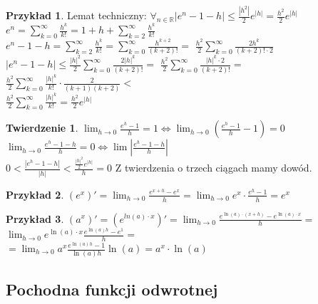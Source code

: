 \documentclass{article}
\theoremstyle{definition}
\theoremstyle{definition}
\newtheorem{tw}{Twierdzenie}[subsection]
\theoremstyle{definition}
\newtheorem{pk}{Przykład}[subsection]
\theoremstyle{definition}
\begin{document}
\begin{pk}
    Lemat techniczny:
    $\forall_{n\in\mathbb{R}} |e^n-1-h| \leq \frac{|h^2|}{2}e^{|h|} = \frac{h^2}{2}e^{|h|}$\\
    $e^n=\sum_{k=0}^{\infty} \frac{h^k}{k!}= 1+h+\sum_{k=2}^{\infty} \frac{h^k}{k!}$\\
    $e^n-1-h=\sum_{k=2}^{\infty} \frac{h^k}{k!} = \sum_{k=0}^{\infty} \frac{h^{k+2}}{(k+2)!}=$
    $\frac{h^2}{2} \sum_{k=0}^{\infty} \frac{2h^k}{(k+2)!\cdot 2}$\\
    $|e^n-1-h| \leq \frac{|h|^2}{2} \sum_{k=0}^{\infty} \frac{2|h|^k}{(k+2)!}=$
    $\frac{h^2}{2}\sum_{k=0}^{\infty} \frac{|h|^k\cdot 2}{(k+2)!}=$
    $\frac{h^2}{2}\sum_{k=0}^{\infty} \frac{|h|^k}{k!} \cdot \frac{2}{(k+1)(k+2)}<$\\
    $\frac{h^2}{2}\sum_{k=0}^{\infty} \frac{|h|^k}{k!}=\frac{h^2}{2}e^{|h|}$
\end{pk}

\begin{tw}
    $\lim_{h\rightarrow 0} \frac{e^h-1}{h}=1 \iff \lim_{h\rightarrow 0} \left(\frac{e^h-1}{h}-1\right)=0$\\
    $\lim_{h\rightarrow 0} \frac{e^h-1-h}{h}=0 \iff \lim \left|\frac{e^h - 1 -h}{h}\right|$\\
    $0<\frac{|e^h-1-h|}{|h|}<\frac{\frac{|h|^2}{2}e^{|h|}}{h}=0$
    Z twierdzenia o trzech ciągach mamy dowód.
\end{tw}

\begin{pk}
    $(e^x)'=\lim_{h\rightarrow 0} \frac{e^{x+h}-e^x}{h} = \lim_{h\rightarrow 0} e^x\cdot \frac{e^h-1}{h} = e^x$   
\end{pk}

\begin{pk}
    $(a^x)'=(e^{ln(a)\cdot x})'=\lim_{h\rightarrow 0} \frac{e^{\ln(a)\cdot(x+h)}-e^{\ln(a)\cdot x}}{h}=$
    $\lim_{h\rightarrow 0} e^{\ln(a)\cdot x} \frac{e^{\ln(a) h}- e^{1}}{h}=$\\
    $=\lim_{h\rightarrow 0} a^x \frac{e^{\ln(a)h}-1}{\ln(a) h} \ln(a) = a^x \cdot \ln(a)$
\end{pk}

\subsection{Pochodna funkcji odwrotnej}
\end{document}
